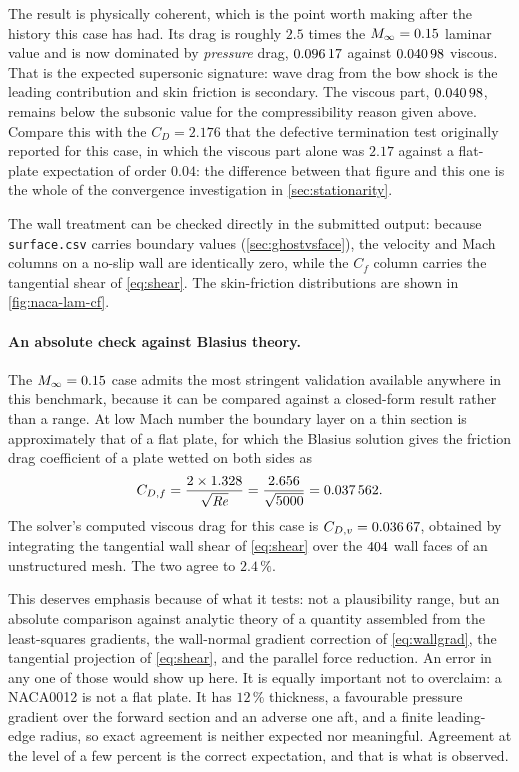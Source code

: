 The result is physically coherent, which is the point worth making after the history this
case has had. Its drag is roughly $2.5$ times the $M_\infty=0.15$ laminar value and is now
dominated by \emph{pressure} drag, $\num{0.09617}$ against $\num{0.04098}$ viscous.
That is the expected supersonic signature: wave drag from the bow shock is the leading
contribution and skin friction is secondary. The viscous part, $\num{0.04098}$, remains
below the subsonic value for the compressibility reason given above. Compare this with the
$C_D=2.176$ that the defective termination test originally reported for this case, in which
the viscous part alone was $2.17$ against a flat-plate expectation of order $0.04$: the
difference between that figure and this one is the whole of the convergence investigation
in \cref{sec:stationarity}.

The wall treatment can be checked directly in the submitted output: because
\texttt{surface.csv} carries boundary values (\cref{sec:ghostvsface}), the
velocity and Mach columns on a no-slip wall are identically zero, while the $C_f$
column carries the tangential shear of \cref{eq:shear}. The skin-friction
distributions are shown in \cref{fig:naca-lam-cf}.

\paragraph{An absolute check against Blasius theory.} The $M_\infty=0.15$ case
admits the most stringent validation available anywhere in this benchmark,
because it can be compared against a closed-form result rather than a range. At
low Mach number the boundary layer on a thin section is approximately that of a
flat plate, for which the Blasius solution gives the friction drag coefficient of
a plate wetted on both sides as
\begin{equation}
  C_{D,f}=\frac{2\times1.328}{\sqrt{\mathit{Re}}}
  =\frac{2.656}{\sqrt{5000}}=\num{0.037562}.
  \label{eq:blasius}
\end{equation}
The solver's computed viscous drag for this case is
$C_{D,v}=\num{0.03667}$, obtained by integrating the tangential wall shear of
\cref{eq:shear} over the $404$ wall faces of an unstructured mesh.
The two agree to $2.4\,\%$.

This deserves emphasis because of what it tests: not a plausibility range, but an
absolute comparison against analytic theory of a quantity assembled from the
least-squares gradients, the wall-normal gradient correction of
\cref{eq:wallgrad}, the tangential projection of \cref{eq:shear}, and the
parallel force reduction. An error in any one of those would show up here. It is
equally important not to overclaim: a NACA0012 is not a flat plate. It has
$12\,\%$ thickness, a favourable pressure gradient over the forward section and an
adverse one aft, and a finite leading-edge radius, so exact agreement is neither
expected nor meaningful. Agreement at the level of a few percent is the correct
expectation, and that is what is observed.

